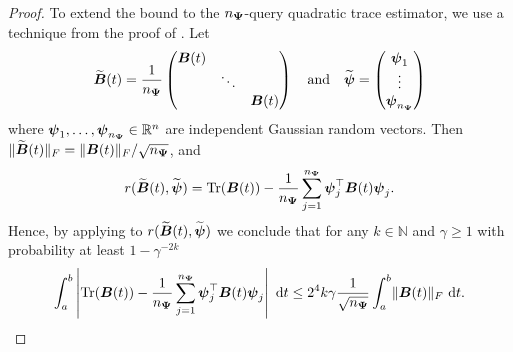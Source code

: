 \documentclass[12pt]{article}
\begin{document}
\begin{proof}
    To extend the bound to the $n_{\boldsymbol{\Psi}}$-query quadratic trace estimator, we use a technique from the proof of \cite[theorem 1]{cortinovis-2022-randomized-trace}. Let
    \begin{equation}
        \widetilde{\boldsymbol{B}}(t)
        = \frac{1}{n_{\boldsymbol{\Psi}}} \begin{pmatrix}
            \boldsymbol{B}(t) & & \\
            & \ddots & \\
            & & \boldsymbol{B}(t)
        \end{pmatrix}
        \quad \text{and} \quad
        \widetilde{\boldsymbol{\psi}} = \begin{pmatrix}
            \boldsymbol{\psi}_1 \\
            \vdots \\
            \boldsymbol{\psi}_{n_{\boldsymbol{\Psi}}}
        \end{pmatrix}
    \end{equation}
    where $\boldsymbol{\psi}_1, \dots, \boldsymbol{\psi}_{n_{\boldsymbol{\Psi}}} \in \mathbb{R}^{n}$ are independent Gaussian random vectors. Then $\lVert \widetilde{\boldsymbol{B}}(t) \rVert _F = \lVert \boldsymbol{B}(t) \rVert _F / \sqrt{n_{\boldsymbol{\Psi}}}$, and
    \begin{equation}
        r(\widetilde{\boldsymbol{B}}(t), \widetilde{\boldsymbol{\psi}}) = \operatorname{Tr}(\boldsymbol{B}(t)) - \frac{1}{n_{\boldsymbol{\Psi}}} \sum_{j=1}^{n_{\boldsymbol{\Psi}}} \boldsymbol{\psi}_j^{\top} \boldsymbol{B}(t) \boldsymbol{\psi}_j.
    \end{equation}
    Hence, by applying  to $r(\widetilde{\boldsymbol{B}}(t), \widetilde{\boldsymbol{\psi}})$ we conclude that for any $k \in \mathbb{N}$ and $\gamma \geq 1$ with probability at least $1 - \gamma^{-2 k}$
    \begin{equation}
        \int_{a}^{b} \left| \operatorname{Tr}(\boldsymbol{B}(t)) - \frac{1}{n_{\boldsymbol{\Psi}}} \sum_{j=1}^{n_{\boldsymbol{\Psi}}} \boldsymbol{\psi}_j^{\top} \boldsymbol{B}(t) \boldsymbol{\psi}_j \right| ~ \mathrm{d}t
        \leq 2^4 k \gamma \frac{1}{\sqrt{n_{\boldsymbol{\Psi}}}} \int_{a}^{b} \lVert \boldsymbol{B}(t) \rVert _F~\mathrm{d}t.
    \end{equation}


\end{proof}
\end{document}
